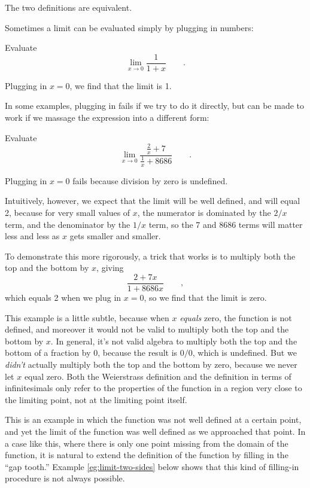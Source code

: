 The two definitions are equivalent.

Sometimes a limit can be evaluated simply by plugging in numbers:

\begin{eg}
\egquestion Evaluate
\begin{equation*}
  \lim_{x\rightarrow 0} \frac{1}{1+x} \qquad .
\end{equation*}

\eganswer Plugging in $x=0$, we find that the limit is 1.
\end{eg}

In some examples, plugging in fails if we try to do it directly, but
can be made to work if we massage the expression into a different form:

\begin{eg}
\egquestion Evaluate
\begin{equation*}
  \lim_{x\rightarrow 0} \frac{\frac{2}{x}+7}{\frac{1}{x}+8686} \qquad .
\end{equation*}

\eganswer Plugging in $x=0$ fails because division by zero is undefined.

Intuitively, however, we expect that the limit will be well defined, and will
equal 2, because for very small values of $x$, the numerator is dominated
by the $2/x$ term, and the denominator by the $1/x$ term, so the 7 and 8686 terms
will matter less and less as $x$ gets smaller and smaller.

To demonstrate this more rigorously, a trick that works is to multiply both the top and the bottom by $x$, giving
\begin{equation*}
  \frac{2+7x}{1+8686x} \qquad ,
\end{equation*}
which equals 2 when we plug in $x=0$, so we find that the limit is zero.

This example is a little subtle, because
when $x$ \emph{equals} zero, the function is not defined, and moreover it would
not be valid to multiply both the top and the bottom by $x$. In general, it's not
valid algebra to multiply both the top and the bottom of a fraction by 0, because the
result is $0/0$, which is undefined. But we \emph{didn't} actually multiply both the
top and the bottom by zero, because we never let $x$ equal zero. Both the Weierstrass
definition and the definition in terms of infinitesimals only refer to the properties of
the function in a region very close to the limiting point, not at the limiting point itself.

This is an example in which the function was not well defined at a certain point, and
yet the limit of the function was well defined as we approached that point. In a case like
this, where there is only one point missing from the domain of the function, it is natural
to extend the definition of the function by filling in the ``gap tooth.'' Example \ref{eg:limit-two-sides}
below shows that this kind of filling-in procedure is not always possible.
\end{eg}

